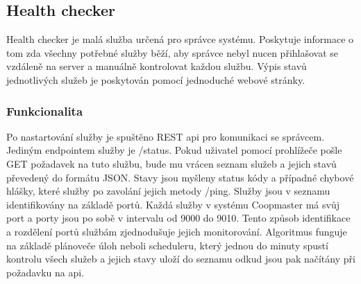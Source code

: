 

\subsection{Health checker}\label{subsec:health-checker}
Health checker je malá služba určená pro správce systému.
Poskytuje informace o tom zda všechny potřebné služby běží, aby správce nebyl nucen přihlašovat se vzdáleně na server a manuálně kontrolovat každou službu.
Výpis stavů jednotlivých služeb je poskytován pomocí jednoduché webové stránky.

\subsubsection{Funkcionalita}
Po nastartování služby je spuštěno REST api pro komunikaci se správcem.
Jediným endpointem služby je /status.
Pokud uživatel pomocí prohlížeče pošle GET požadavek na tuto službu, bude mu vrácen seznam služeb a jejich stavů převedený do formátu JSON.
Stavy jsou myšleny status kódy a případné chybové hlášky, které služby po zavolání jejich metody /ping.
Služby jsou v seznamu identifikovány na základě portů.
Každá služby v systému Coopmaster má svůj port a porty jsou po sobě v intervalu od 9000 do 9010.
Tento způsob identifikace a rozdělení portů službám zjednodušuje jejich monitorování.
Algoritmus funguje na základě plánoveče úloh neboli scheduleru, který jednou do minuty spustí kontrolu všech služeb a jejich stavy uloží do seznamu odkud jsou pak načítány při požadavku na api.

